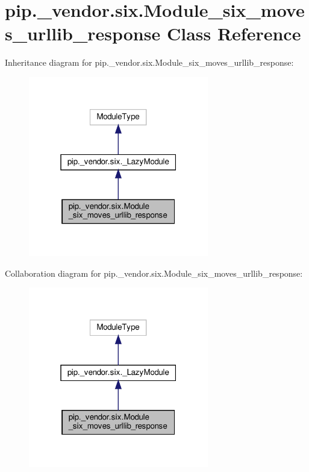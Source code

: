 \hypertarget{classpip_1_1__vendor_1_1six_1_1Module__six__moves__urllib__response}{}\section{pip.\+\_\+vendor.\+six.\+Module\+\_\+six\+\_\+moves\+\_\+urllib\+\_\+response Class Reference}
\label{classpip_1_1__vendor_1_1six_1_1Module__six__moves__urllib__response}


Inheritance diagram for pip.\+\_\+vendor.\+six.\+Module\+\_\+six\+\_\+moves\+\_\+urllib\+\_\+response\+:
\nopagebreak
\begin{figure}[H]
\begin{center}
\leavevmode
\includegraphics[width=223pt]{classpip_1_1__vendor_1_1six_1_1Module__six__moves__urllib__response__inherit__graph}
\end{center}
\end{figure}


Collaboration diagram for pip.\+\_\+vendor.\+six.\+Module\+\_\+six\+\_\+moves\+\_\+urllib\+\_\+response\+:
\nopagebreak
\begin{figure}[H]
\begin{center}
\leavevmode
\includegraphics[width=223pt]{classpip_1_1__vendor_1_1six_1_1Module__six__moves__urllib__response__coll__graph}
\end{center}
\end{figure}
